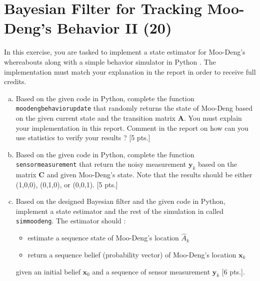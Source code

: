 \section{ Bayesian Filter for Tracking Moo-Deng's Behavior II (20)}
In this exercise, you are tasked to implement a state estimator for Moo-Deng's whereabouts along with a simple behavior simulator in Python . The implementation must match your explanation in the report in order to receive full credits.
\begin{enumerate}[a)]
    \item Based on the given code in Python, complete the function  \texttt{moodeng\textunderscore behavior\textunderscore update} that randomly returns the state of Moo-Deng based on the given current state and the transition matrix $\mathbf{A}$. 
You must explain your implementation in this report. Comment in the report on how can you use statistics to verify your results ? [5 pts.]
\item Based on the given code in Python, complete the function \texttt{sensor\textunderscore measurement}  that return the noisy measurement $\mathbf{y}_k$ based on the matrix $\mathbf{C}$ and given Moo-Deng's state. Note that the results should be either (1,0,0), (0,1,0), or (0,0,1). [5 pts.]
\item Based on the designed Bayesian filter and the given code in Python, implement a state estimator and the rest of the simulation in  called \texttt{sim\textunderscore moodeng}. The estimator should :
\begin{itemize}
    \item estimate a sequence state of Moo-Deng's location $\hat{A}_k$
    \item return a sequence belief (probability vector) of Moo-Deng's location $\mathbf{x}_k$
\end{itemize} 
given an initial belief $\mathbf{x}_0$ and a sequence of sensor measurement $\mathbf{y}_k$ [6 pts.]. 
\end{enumerate}

